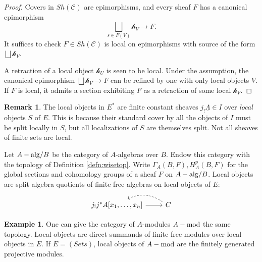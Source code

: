 \documentclass[11pt,reqno]{amsart}
\theoremstyle{definition}
\newtheorem{example}[theorem]{Example}
\newtheorem{remark}[theorem]{Remark}
\newcommand{\NN}{{\mathbf{N}}}
\newcommand{\hh}[1]{\mathcal{h}_{#1}}
\newcommand{\cal}[1]{\ensuremath{\mathcal{#1}}}
\newcommand{\bra}[1]{\left[#1\right]}
\newcommand{\Aalg}{A-{\rm alg}}
\newcommand{\Amod}{A-{\rm mod}}
\begin{document}
\begin{proof}

Covers in $Sh(\cal C)$ are epimorphisms, and every sheaf $F$ has a canonical epimorphism 
\[\bigsqcup_{s \in F(V)} \hh{V} \to F.\]
It suffices to check $F \in Sh(\cal C)$ is local on epimorphisms with source of the form $\bigsqcup \hh{V}$. 

A retraction of a local object $\hh{U}$ is seen to be local. Under the assumption, the canonical epimorphism $\bigsqcup \hh{V} \to F$ can be refined by one with only local objects $V$. If $F$ is local, it admits a section exhibiting $F$ as a retraction of some local $\hh{V}$. 

\end{proof}





\begin{remark}
The local objects in $E^*$ are finite constant sheaves $j_! \underline{\Lambda} \in I$ over \textit{local} objects $S$ of $E$. This is because their standard cover by all the objects of $I$ must be split locally in $S$, but all localizations of $S$ are themselves split. Not all sheaves of finite sets are local. 

\end{remark}




Let $\Aalg/B$ be the category of $A$-algebras over $B$. Endow this category with the topology of Definition \ref{defn:wisetop}. Write $\Gamma_A(B, F), H^p_A(B, F)$ for the global sections and cohomology groups of a sheaf $F$ on $\Aalg/B$. Local objects are split algebra quotients of finite free algebras on local objects of $E$:
\[
\begin{tikzcd}
j_! j^*A[x_1, \dots, x_n] \ar[r]   &C \ar[l, bend right, dashed]
\end{tikzcd}
\]



\begin{example}

One can give the category of $A$-modules $\Amod$ the same topology. Local objects are direct summands of finite free modules over local objects in $E$. If $E = (Sets)$, local objects of $\Amod$ are the finitely generated projective modules. 

\end{example}
\end{document}
